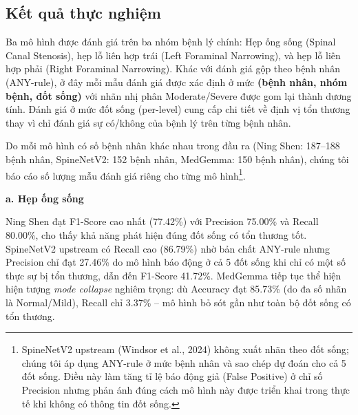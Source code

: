
\subsection{Kết quả thực nghiệm}

Ba mô hình được đánh giá trên ba nhóm bệnh lý chính: Hẹp ống sống (Spinal Canal Stenosis), hẹp lỗ liên hợp trái (Left Foraminal Narrowing), và hẹp lỗ liên hợp phải (Right Foraminal Narrowing). Khác với đánh giá gộp theo bệnh nhân (ANY-rule), ở đây mỗi mẫu đánh giá được xác định ở mức \textbf{(bệnh nhân, nhóm bệnh, đốt sống)} với nhãn nhị phân Moderate/Severe được gom lại thành dương tính. Đánh giá ở mức đốt sống (per-level) cung cấp chi tiết về định vị tổn thương thay vì chỉ đánh giá sự có/không của bệnh lý trên từng bệnh nhân.

Do mỗi mô hình có số bệnh nhân khác nhau trong đầu ra (Ning Shen: 187--188 bệnh nhân, SpineNetV2: 152 bệnh nhân, MedGemma: 150 bệnh nhân), chúng tôi báo cáo số lượng mẫu đánh giá riêng cho từng mô hình\footnote{SpineNetV2 upstream (Windsor et al., 2024) không xuất nhãn theo đốt sống; chúng tôi áp dụng ANY-rule ở mức bệnh nhân và sao chép dự đoán cho cả 5 đốt sống. Điều này làm tăng tỉ lệ báo động giả (False Positive) ở chỉ số Precision nhưng phản ánh đúng cách mô hình này được triển khai trong thực tế khi không có thông tin đốt sống.}.

\textbf{a. Hẹp ống sống}

Ning Shen đạt F1-Score cao nhất (77.42\%) với Precision 75.00\% và Recall 80.00\%, cho thấy khả năng phát hiện đúng đốt sống có tổn thương tốt. SpineNetV2 upstream có Recall cao (86.79\%) nhờ bản chất ANY-rule nhưng Precision chỉ đạt 27.46\% do mô hình báo động ở cả 5 đốt sống khi chỉ có một số thực sự bị tổn thương, dẫn đến F1-Score 41.72\%. MedGemma tiếp tục thể hiện hiện tượng \textit{mode collapse} nghiêm trọng: dù Accuracy đạt 85.73\% (do đa số nhãn là Normal/Mild), Recall chỉ 3.37\% -- mô hình bỏ sót gần như toàn bộ đốt sống có tổn thương.

